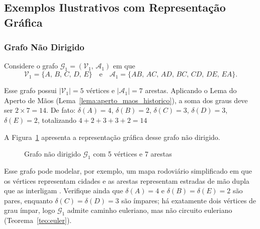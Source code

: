\documentclass[
  12pt,
  oneside,
  a4paper,
  english,
  brazilian
  ]{abntex2}
\theoremstyle{definition}
\def\sffamily{}%
\def\bfseries{}%
\begin{document}
\subsection{Exemplos Ilustrativos com Representação Gráfica}

\subsubsection{Grafo Não Dirigido}

\label{ex:nao_dirigido}
Considere o grafo $\mathcal{G}_1 = (\mathcal{V}_1,\, \mathcal{A}_1)$ em que
\[
  \mathcal{V}_1 = \{A,\, B,\, C,\, D,\, E\}
  \quad \text{e} \quad
  \mathcal{A}_1 = \{AB,\, AC,\, AD,\, BC,\, CD,\, DE,\, EA\}.
\]

Esse grafo possui $|\mathcal{V}_1| = 5$ vértices e $|\mathcal{A}_1| = 7$
arestas. Aplicando o Lema do Aperto de Mãos
(Lema~\ref{lema:aperto_maos_historico}), a soma dos graus deve ser $2 \times 7 = 14$. De fato: $\delta(A) = 4$, $\delta(B) = 2$, $\delta(C) = 3$, $\delta(D) = 3$,
$\delta(E) = 2$, totalizando $4 + 2 + 3 + 3 + 2 = 14$ \checkmark

A Figura~\ref{fig:grafo_nao_dirigido} apresenta a representação gráfica desse
grafo não dirigido.

\begin{figure}[htb]
  \centering
  \caption{Grafo não dirigido $\mathcal{G}_1$ com 5 vértices e 7 arestas}
  \label{fig:grafo_nao_dirigido}
\end{figure}

Esse grafo pode modelar, por exemplo, um mapa rodoviário simplificado em que os
vértices representam cidades e as arestas representam estradas de mão dupla que
as interligam \cite{jurkiewicz2007}. Verifique ainda que $\delta(A) = 4$ e
$\delta(B) = \delta(E) = 2$ são pares, enquanto $\delta(C) = \delta(D) = 3$
são ímpares; há exatamente dois vértices de grau ímpar, logo $\mathcal{G}_1$
admite caminho euleriano, mas não circuito euleriano
(Teorema~\ref{teo:euler}).
\end{document}
